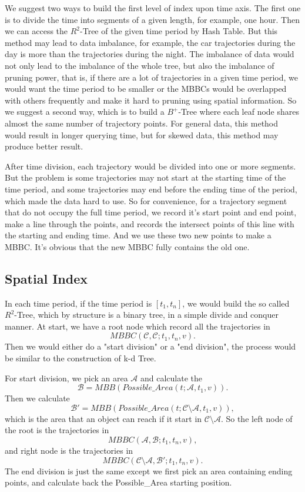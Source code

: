 \documentclass[sigplan]{acmart}
\begin{document}
We suggest two ways to build the first level of index upon time axis. The first one is to divide the time into segments of a given length, for example, one hour. Then we can access the $R^2$-Tree of the given time period by Hash Table. But this method may lead to data imbalance, for example, the car trajectories during the day is more than the trajectories during the night. The imbalance of data would not only lead to the imbalance of the whole tree, but also the imbalance of pruning power, that is, if there are a lot of trajectories in a given time period, we would want the time period to be smaller or the MBBCs would be overlapped with others frequently and make it hard to pruning using spatial information. So we suggest a second way, which is to build a $B^+$-Tree where each leaf node shares almost the same number of trajectory points. For general data, this method would result in longer querying time, but for skewed data, this method may produce better result.\par

After time division, each trajectory would be divided into one or more segments. But the problem is some trajectories may not start at the starting time of the time period, and some trajectories may end before the ending time of the period, which made the data hard to use. So for convenience, for a trajectory segment that do not occupy the full time period, we record it's start point and end point, make a line through the points, and records the intersect points of this line with the starting and ending time. And we use these two new points to make a MBBC. It's obvious that the new MBBC fully contains the old one.

\subsection{Spatial Index}
In each time period, if the time period is $[t_1,t_n]$, we would build the so called $R^2$-Tree, which by structure is a binary tree, in a simple divide and conquer manner. At start, we have a root node which record all the trajectories in $$MBBC(\mathcal{C},\mathcal{C};t_1,t_n,v).$$ Then we would either do a "start division" or a "end division", the process would be similar to the construction of k-d Tree.\par

For start division, we pick an area $\mathcal{A}$ and calculate the $$\mathcal{B}=MBB(Possible\_Area(t;\mathcal{A},t_1,v)).$$
Then we calculate $$\mathcal{B'}=MBB(Possible\_Area(t;\mathcal{C} \setminus \mathcal{A},t_1,v)),$$
which is the area that an object can reach if it start in $\mathcal{C}\setminus \mathcal{A}$. So the left node of the root is the trajectories in $$MBBC(\mathcal{A},\mathcal{B};t_1,t_n,v),$$ and right node is the trajectories in $$MBBC(\mathcal{C}\setminus \mathcal{A},\mathcal{B'};t_1,t_n,v).$$ The end division is just the same except we first pick an area containing ending points, and calculate back the Possible\_Area starting position.\par
\end{document}
